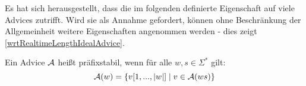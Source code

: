 \begin{comment}
    \begin{satz}
        Es gibt einen Zellularautomaten $C$,
        sodass für $i \in \Z$ und $t \in \Nz$ mit $i - 2 < t < 3*2^{2-i+t}-i$ gilt:
        \[
            (\Delta^{t}_{C}(c_{exp})_i)_e = 1 \Leftrightarrow \exists k \in \Nz: i + t = 2^k
        \]
        Wegen \cref{lemmaNumberTheoryInequality} gilt die Aussage insbesondere,
        falls $i \geq 1$ und $t \geq 2i - 2$.
    \end{satz}
    \begin{proof}
        Nach \cref{linksunabhaengigSpeedup} gibt es einen Zellularautomaten $C$,
        sodass $\Delta^t_{C}(c_{exp})_i = \Delta^{2t}_{C_{exp}}(c_{exp})_{i-t}$.
        Aus den Voraussetzungen folgt, dass $i-t < 2$ und $2t < 3 * 2^{2-(i-t)}-(i-t)$.
        Es gilt damit mit \cref{lemmaCExpProp2}:
        \[
            i + t = (i-t) + 2t = 2^k
            \Leftrightarrow(\Delta^{2t}_{C_{exp}}(c_{exp})_{i-t})_e = 1
            \Leftrightarrow (\Delta^t_{C}(c_{exp})_{i})_e = 1
        \]        
        
    \end{proof}
\end{comment}


Es hat sich herausgestellt, dass die im folgenden definierte Eigenschaft auf viele Advices zutrifft.
Wird sie als Annahme gefordert, können ohne Beschränkung der Allgemeinheit weitere Eigenschaften angenommen werden - 
dies zeigt \cref{wrtRealtimeLengthIdealAdvice}.

\begin{definition}[Präfixstabil]
    Ein Advice $\mathcal{A}$ heißt präfixstabil, wenn für alle $w, s \in \Sigma^*$ gilt:
    \[
        \mathcal{A}(w) =
        \{ { v[1, ..., |w|] } \; | \; { v \in \mathcal{A}(ws) } \}
    \]
\end{definition}

